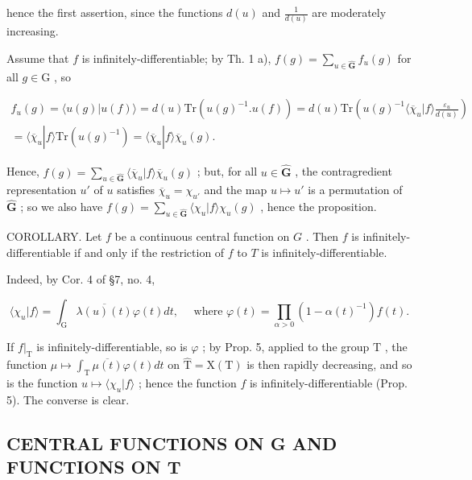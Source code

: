 hence the first assertion, since the functions \(d(u)\) and \(\frac{1}{d(u)}\) are moderately increasing.

Assume that \(f\) is infinitely-differentiable; by Th. 1 a), \(f(g) = \sum_{u\in \hat{\mathbf{G}}}f_u(g)\) for all \(g\in \mathrm{G}\) , so

\[
\begin{array}{c} f _ {u} (g) = \langle u (g) | u (f) \rangle = d (u) \mathrm{Tr} (u (g) ^ {- 1}. u (f)) = d (u) \mathrm{Tr} \left(u (g) ^ {- 1} \langle \overline {{\chi}} _ {u} | f \rangle \frac {\varepsilon_ {u}}{d (u)}\right) \\ = \langle \overline {{\chi}} _ {u} | f \rangle \mathrm{Tr} (u (g) ^ {- 1}) = \langle \overline {{\chi}} _ {u} | f \rangle \overline {{\chi}} _ {u} (g). \end{array}
\]

Hence, \(f(g) = \sum_{u\in \hat{\mathbf{G}}}\langle \overline{\chi}_u|f\rangle \overline{\chi}_u(g)\) ; but, for all \(u\in \hat{\mathbf{G}}\) , the contragredient representation \(u'\) of \(u\) satisfies \(\overline{\chi}_u = \chi_{u'}\) and the map \(u\mapsto u'\) is a permutation of \(\hat{\mathbf{G}}\) ; so we also have \(f(g) = \sum_{u\in \hat{\mathbf{G}}}\langle \chi_u|f\rangle \chi_u(g)\) , hence the proposition.

COROLLARY. Let \(f\) be a continuous central function on \(G\) . Then \(f\) is infinitely-differentiable if and only if the restriction of \(f\) to \(T\) is infinitely-differentiable.

Indeed, by Cor. 4 of §7, no. 4,

\[
\langle \chi_ {u} | f \rangle = \int_ {\mathrm{G}} \overline {{\lambda (u) (t)}} \varphi (t) d t, \quad \text { where } \varphi (t) = \prod_ {\alpha > 0} (1 - \alpha (t) ^ {- 1}) f (t).
\]

If \(f|_{\mathrm{T}}\) is infinitely-differentiable, so is \(\varphi\) ; by Prop. 5, applied to the group \(\mathrm{T}\) , the function \(\mu \mapsto \int_{\mathrm{T}} \overline{\mu(t)} \varphi(t) dt\) on \(\hat{\mathrm{T}} = \mathrm{X}(\mathrm{T})\) is then rapidly decreasing, and so is the function \(u \mapsto \langle \chi_u | f \rangle\) ; hence the function \(f\) is infinitely-differentiable (Prop. 5). The converse is clear.

\subsection{CENTRAL FUNCTIONS ON G AND FUNCTIONS ON T}

